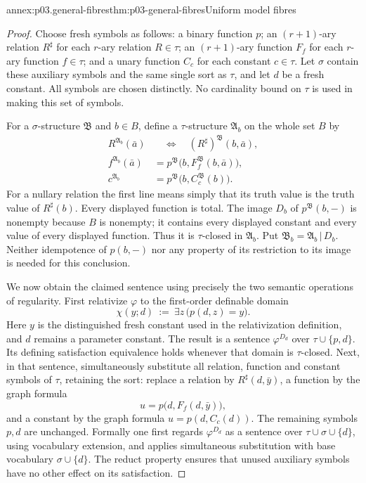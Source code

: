 \begin{annexitem}{annex:p03.general-fibres}{thm:p03-general-fibres}{Uniform model fibres}
\begin{proof}
Choose fresh symbols as follows: a binary function \(p\); an
\((r+1)\)-ary relation \(R^\sharp\) for each \(r\)-ary relation
\(R\in\tau\); an \((r+1)\)-ary function \(F_f\) for each
\(r\)-ary function \(f\in\tau\); and a unary function \(C_c\) for
each constant \(c\in\tau\). Let \(\sigma\) contain these auxiliary symbols and the same single
sort as \(\tau\), and let \(d\) be a fresh constant. All symbols are chosen distinctly.
No cardinality bound on \(\tau\) is used in making this set of symbols.

For a \(\sigma\)-structure \(\mathfrak B\) and \(b\in B\), define a
\(\tau\)-structure \(\mathfrak A_b\) on the whole set \(B\) by
\[
\begin{aligned}
 R^{\mathfrak A_b}(\bar a)
   &\quad\Longleftrightarrow\quad
       (R^\sharp)^{\mathfrak B}(b,\bar a),\\
 f^{\mathfrak A_b}(\bar a)
   &=p^{\mathfrak B}\bigl(b,F_f^{\mathfrak B}(b,\bar a)\bigr),\\
 c^{\mathfrak A_b}
   &=p^{\mathfrak B}\bigl(b,C_c^{\mathfrak B}(b)\bigr).
\end{aligned}
\]
For a nullary relation the first line means simply that its truth value
is the truth value of \(R^\sharp(b)\). Every displayed function is total.
The image \(D_b\) of \(p^{\mathfrak B}(b,-)\) is nonempty because
\(B\) is nonempty; it contains every displayed constant and every
value of every displayed function. Thus it is \(\tau\)-closed in
\(\mathfrak A_b\). Put
\(\mathfrak B_b=\mathfrak A_b\,|\,D_b\).
Neither idempotence of \(p(b,-)\) nor any property of its restriction
to its image is needed for this conclusion.

We now obtain the claimed sentence using precisely the two semantic
operations of regularity. First relativize \(\varphi\) to the
first-order definable domain
\[
 \chi(y;d)\ :=\ \exists z\,\bigl(p(d,z)=y\bigr).
\]
Here \(y\) is the distinguished fresh constant used in the
relativization definition, and \(d\) remains a parameter constant.
The result is a sentence \(\varphi^{D_d}\) over
\(\tau\cup\{p,d\}\). Its defining satisfaction equivalence holds
whenever that domain is \(\tau\)-closed. Next, in that sentence,
simultaneously substitute all relation, function and constant symbols
of \(\tau\), retaining the sort: replace a
relation by \(R^\sharp(d,\bar y)\), a function by the graph formula
\[
 u=p\bigl(d,F_f(d,\bar y)\bigr),
\]
and a constant by the graph formula \(u=p(d,C_c(d))\).
The remaining symbols \(p,d\) are unchanged. Formally one first regards
\(\varphi^{D_d}\) as a sentence over
\(\tau\cup\sigma\cup\{d\}\), using vocabulary extension, and applies
simultaneous substitution with base vocabulary \(\sigma\cup\{d\}\).
The reduct property ensures that unused auxiliary symbols have no
other effect on its satisfaction.


\end{proof}
\end{annexitem}
